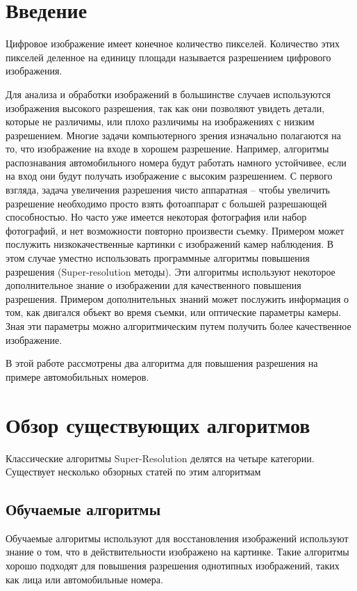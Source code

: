 \section{Введение}
Цифровое изображение имеет конечное количество пикселей. Количество этих пикселей деленное на единицу площади называется
разрешением цифрового изображения.

Для анализа и обработки изображений в большинстве случаев используются изображения высокого разрешения, так как они
позволяют увидеть детали, которые не различимы, или плохо различимы на изображениях с низким разрешением. Многие задачи
компьютерного зрения изначально полагаются на то, что изображение на входе в хорошем разрешение. Например, алгоритмы
распознавания автомобильного номера будут работать намного устойчивее, если на вход они будут получать изображение с
высоким разрешением. С первого взгляда,
задача увеличения разрешения чисто аппаратная -- чтобы увеличить разрешение необходимо просто взять фотоаппарат с
большей разрешающей способностью. Но часто уже имеется некоторая фотография или набор фотографий, и нет возможности
повторно произвести съемку. Примером может послужить низкокачественные картинки с изображений камер наблюдения. В этом
случае уместно использовать программные алгоритмы повышения разрешения (Super-resolution методы).  Эти алгоритмы
используют некоторое дополнительное знание о изображении для качественного повышения разрешения. Примером
дополнительных знаний может послужить информация о том, как двигался объект во время съемки, или оптические параметры
камеры. Зная эти параметры можно алгоритмическим путем получить более качественное изображение.

В этой работе рассмотрены два алгоритма для повышения разрешения на примере автомобильных номеров.

\section{Обзор существующих алгоритмов} Классические алгоритмы Super-Resolution делятся на четыре
категории.  Существует несколько обзорных статей по
этим алгоритмам \cite{ParkS.C.2003,tian2011survey}

\subsection{Обучаемые алгоритмы}
Обучаемые алгоритмы используют для восстановления изображений используют знание о том, что в действительности изображено
на картинке. Такие алгоритмы хорошо подходят для повышения разрешения однотипных изображений, таких как лица или
автомобильные номера.


